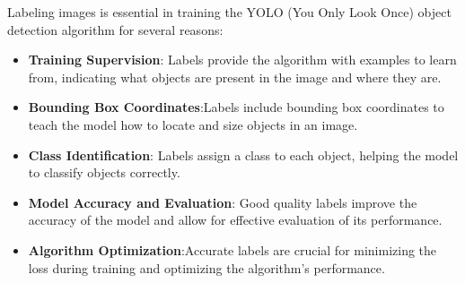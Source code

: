 \documentclass[12pt,a4paper]{article}
\begin{document}
Labeling images is essential in training the YOLO (You Only Look Once) object detection algorithm for several reasons: 

\begin{itemize}
    \item \textbf{Training Supervision}: Labels provide the algorithm with examples to learn from, indicating what objects are present in the image and where they are.
    \item \textbf{Bounding Box Coordinates}:Labels include bounding box coordinates to teach the model how to locate and size objects in an image. 
    \item \textbf{Class Identification}: Labels assign a class to each object, helping the model to classify objects correctly.
    \item  \textbf{Model Accuracy and Evaluation}: Good quality labels improve the accuracy of the model and allow for effective evaluation of its performance.
    \item \textbf{Algorithm Optimization}:Accurate labels are crucial for minimizing the loss during training and optimizing the algorithm's performance.
\end{itemize}
\newpage
\end{document}
